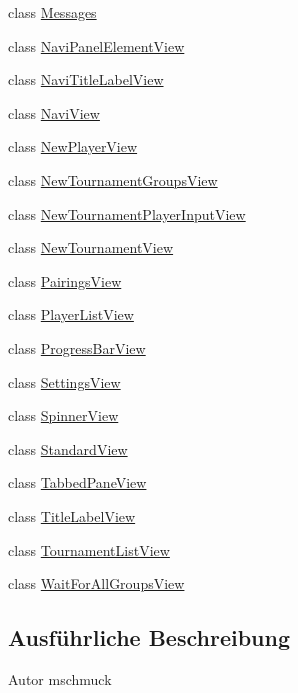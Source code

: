 \begin{DoxyCompactItemize}
\item 
class \hyperlink{classde_1_1turnierverwaltung_1_1view_1_1_messages}{Messages}
\item 
class \hyperlink{classde_1_1turnierverwaltung_1_1view_1_1_navi_panel_element_view}{Navi\+Panel\+Element\+View}
\item 
class \hyperlink{classde_1_1turnierverwaltung_1_1view_1_1_navi_title_label_view}{Navi\+Title\+Label\+View}
\item 
class \hyperlink{classde_1_1turnierverwaltung_1_1view_1_1_navi_view}{Navi\+View}
\item 
class \hyperlink{classde_1_1turnierverwaltung_1_1view_1_1_new_player_view}{New\+Player\+View}
\item 
class \hyperlink{classde_1_1turnierverwaltung_1_1view_1_1_new_tournament_groups_view}{New\+Tournament\+Groups\+View}
\item 
class \hyperlink{classde_1_1turnierverwaltung_1_1view_1_1_new_tournament_player_input_view}{New\+Tournament\+Player\+Input\+View}
\item 
class \hyperlink{classde_1_1turnierverwaltung_1_1view_1_1_new_tournament_view}{New\+Tournament\+View}
\item 
class \hyperlink{classde_1_1turnierverwaltung_1_1view_1_1_pairings_view}{Pairings\+View}
\item 
class \hyperlink{classde_1_1turnierverwaltung_1_1view_1_1_player_list_view}{Player\+List\+View}
\item 
class \hyperlink{classde_1_1turnierverwaltung_1_1view_1_1_progress_bar_view}{Progress\+Bar\+View}
\item 
class \hyperlink{classde_1_1turnierverwaltung_1_1view_1_1_settings_view}{Settings\+View}
\item 
class \hyperlink{classde_1_1turnierverwaltung_1_1view_1_1_spinner_view}{Spinner\+View}
\item 
class \hyperlink{classde_1_1turnierverwaltung_1_1view_1_1_standard_view}{Standard\+View}
\item 
class \hyperlink{classde_1_1turnierverwaltung_1_1view_1_1_tabbed_pane_view}{Tabbed\+Pane\+View}
\item 
class \hyperlink{classde_1_1turnierverwaltung_1_1view_1_1_title_label_view}{Title\+Label\+View}
\item 
class \hyperlink{classde_1_1turnierverwaltung_1_1view_1_1_tournament_list_view}{Tournament\+List\+View}
\item 
class \hyperlink{classde_1_1turnierverwaltung_1_1view_1_1_wait_for_all_groups_view}{Wait\+For\+All\+Groups\+View}
\end{DoxyCompactItemize}


\subsection{Ausführliche Beschreibung}
\begin{DoxyAuthor}{Autor}
mschmuck 
\end{DoxyAuthor}
